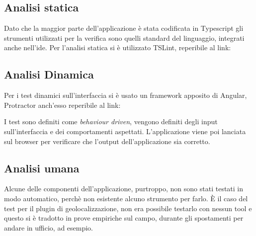 \subsection{Analisi statica}
Dato che la maggior parte dell'applicazione è stata codificata in Typescript gli strumenti utilizzati per la verifica sono quelli standard
del linguaggio, integrati anche nell'\gls{ide}. Per l'analisi statica si è utilizzato TSLint, reperibile al link: \\
\begin{center}
  \cite{site:tslint}
\end{center}
\subsection{Analisi Dinamica}
Per i test dinamici sull'interfaccia si è usato un framework apposito di Angular, Protractor anch'esso reperibile al link: \\
\begin{center}
  \cite{site:protractor}
\end{center}
I test sono definiti come \textit{behaviour driven}, vengono definiti degli input sull'interfaccia e dei comportamenti aspettati.
L'applicazione viene poi lanciata sul browser per verificare che l'output dell'applicazione sia corretto.

\subsection{Analisi umana}
Alcune delle componenti dell'applicazione, purtroppo, non sono stati testati in modo automatico, perchè non esistente alcuno strumento per
farlo. È il caso del test per il plugin di geolocalizzazione, non era possibile testarlo con nessun tool e questo si è tradotto in prove
empiriche sul campo, durante gli spostamenti per andare in ufficio, ad esempio.